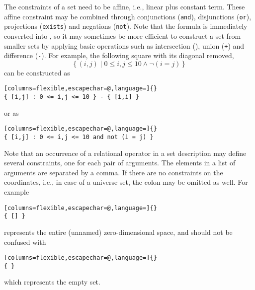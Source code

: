 The constraints of a set need to be affine, i.e., linear plus constant term.
These affine constraint may be combined through conjunctions (\texttt{and}),
disjunctions (\texttt{or}), projections (\texttt{exists}) and
negations (\texttt{not}).
Note that the formula is immediately converted
into , so it may sometimes be more efficient
to construct a set from smaller sets by applying
basic operations such as intersection ({\tt *}),
union ({\tt +}) and difference ({\tt -}).
For example, the following square with its diagonal removed,
$$
\{\,
(i,j) \mid 0 \le i,j \le 10 \wedge \lnot (i = j)
\,\}
$$
can be constructed as
\begin{lstlisting}[columns=flexible,escapechar=@,language=]{}
{ [i,j] : 0 <= i,j <= 10 } - { [i,i] }
\end{lstlisting}
or as
\begin{lstlisting}[columns=flexible,escapechar=@,language=]{}
{ [i,j] : 0 <= i,j <= 10 and not (i = j) }
\end{lstlisting}
Note that an occurrence of a relational operator in a set description
may define several constraints, one for each pair of arguments.
The elements in a list of arguments are separated by a comma.
If there are no constraints on the coordinates, i.e., in case of
a universe set, the colon may be omitted as well.
For example
\begin{lstlisting}[columns=flexible,escapechar=@,language=]{}
{ [] }
\end{lstlisting}
represents the entire (unnamed) zero-dimensional space,
and should not be confused with
\begin{lstlisting}[columns=flexible,escapechar=@,language=]{}
{ }
\end{lstlisting}
which represents the empty set.


